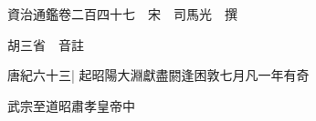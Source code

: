 






























































資治通鑑卷二百四十七　宋　司馬光　撰

胡三省　音註

唐紀六十三|{
	起昭陽大淵獻盡閼逢困敦七月凡一年有奇}


武宗至道昭肅孝皇帝中

